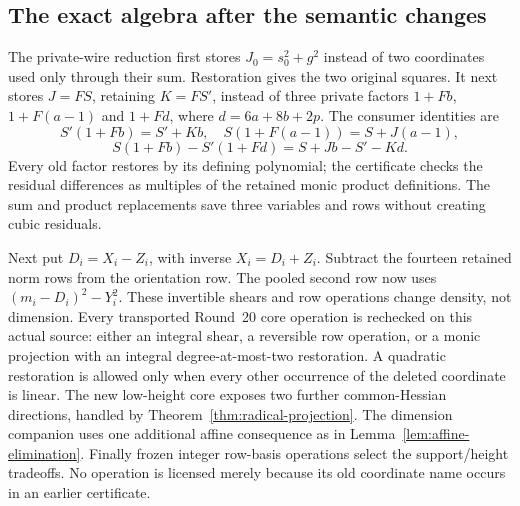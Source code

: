 \subsection{The exact algebra after the semantic changes}
The private-wire reduction first stores $J_0=s_0^2+g^2$ instead of
two coordinates used only through their sum. Restoration gives the two
original squares. It next stores $J=FS$, retaining $K=FS'$, instead
of three private factors $1+Fb$, $1+F(a-1)$ and $1+Fd$,
where $d=6a+8b+2p$. The consumer identities are
\[
 S'(1+Fb)=S'+Kb,\quad S(1+F(a-1))=S+J(a-1),
\]
\[
 S(1+Fb)-S'(1+Fd)=S+Jb-S'-Kd.
\]
Every old factor restores by its defining polynomial; the certificate
checks the residual differences as multiples of the retained monic
product definitions. The sum and product replacements save three
variables and rows without creating cubic residuals.

Next put $D_i=X_i-Z_i$, with inverse $X_i=D_i+Z_i$.
Subtract the fourteen retained norm rows from the orientation row.
The pooled second row now uses $(m_i-D_i)^2-Y_i^2$.
These invertible shears and row operations change density, not dimension.
Every transported Round~20 core operation is rechecked on this actual
source: either an integral shear, a reversible row operation, or a monic
projection with an integral degree-at-most-two restoration. A quadratic
restoration is allowed only when every other occurrence of the deleted
coordinate is linear. The new low-height core exposes two further
common-Hessian directions, handled by
Theorem~\ref{thm:radical-projection}. The dimension companion uses one
additional affine consequence as in Lemma~\ref{lem:affine-elimination}.
Finally frozen integer row-basis operations select the support/height
tradeoffs. No operation is licensed merely because its old coordinate
name occurs in an earlier certificate.
